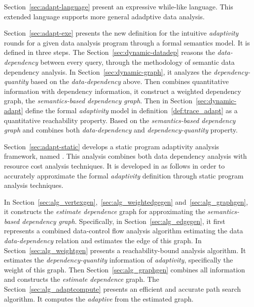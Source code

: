 \begin{enumerate}
    Section~\ref{sec:adapt-language} present an expressive while-like language. This extended language supports more general adadptive data analysis.
    
    Section~\ref{sec:adapt-exe} presents the new definition for
    the intuitive \emph{adaptivity} rounds for a given data analysis program through a formal semantics model.
    It is defined in three steps. 
%
    The Section~\ref{sec:dynamic-datadep} reasons the \emph{data-dependency} between every query, 
    through the methodology of semantic data dependency analysis.
%
    In Section~\ref{sec:dynamic-graph}, it analyzes the \emph{dependency-quantity} 
    based on the \emph{data-dependency} above.
    Then combines quantitative information with dependency information, it construct a weighted dependency graph,
    the \emph{semantics-based dependency graph}.
    Then in Section~\ref{sec:dynamic-adapt} define the formal \emph{adaptivity} model in definition~\ref{def:trace_adapt} as a quantitative reachability property.
   Based on the \emph{semantics-based dependency graph} and combines both \emph{data-dependency} and \emph{dependency-quantity} property.

    Section~\ref{sec:adapt-static} develops a static program adaptivity analysis framework, named {\THESYSTEM}.
    This analysis combines both data dependency analysis with resource cost analysis techniques.
    It is developed in as follows in order to accurately approximate the formal \emph{adaptivity} definition
    through static program analysis techniques. 

    In Section~\ref{sec:alg_vertexgen},~\ref{sec:alg_weightedgegen} and~\ref{sec:alg_graphgen}, it constructs the 
    \emph{estimate dependence} graph for approximating the \emph{semantics-based dependency graph}.
    Specifically, in Section~\ref{sec:alg_edgegen}, it first represents a combined data-control flow analysis algorithm estimating the data \emph{data-dependency} relation and estimates the edge of this graph.
    In Section~\ref{sec:alg_weightgen} presents a reachability-bound analysis algorithm. It estimates the \emph{dependency-quantity} information of \emph{adaptivity}, specifically the weight of this graph.
    Then Section~\ref{sec:alg_graphgen} combines all information and constructs the 
    \emph{estimate dependence} graph.
    The Section~\ref{sec:alg_adaptcompute} presents an efficient and accurate path search algorithm. It computes the \emph{adaptive} from the estimated graph.


\end{enumerate}
